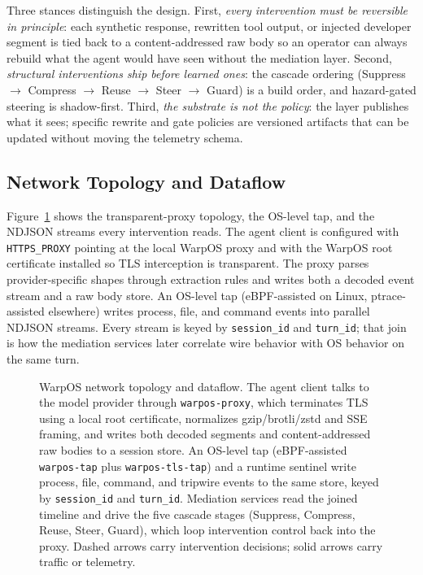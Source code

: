 \documentclass[conference]{IEEEtran}
\begin{document}
Three stances distinguish the design. First, \emph{every intervention must be reversible in principle}: each synthetic response, rewritten tool output, or injected developer segment is tied back to a content-addressed raw body so an operator can always rebuild what the agent would have seen without the mediation layer. Second, \emph{structural interventions ship before learned ones}: the cascade ordering (Suppress $\to$ Compress $\to$ Reuse $\to$ Steer $\to$ Guard) is a build order, and hazard-gated steering is shadow-first. Third, \emph{the substrate is not the policy}: the layer publishes what it sees; specific rewrite and gate policies are versioned artifacts that can be updated without moving the telemetry schema.

\subsection{Network Topology and Dataflow}
\label{app:warpos-net}

Figure~\ref{fig:warpos-arch} shows the transparent-proxy topology, the OS-level tap, and the NDJSON streams every intervention reads. The agent client is configured with \texttt{HTTPS\_PROXY} pointing at the local WarpOS proxy and with the WarpOS root certificate installed so TLS interception is transparent. The proxy parses provider-specific shapes through extraction rules and writes both a decoded event stream and a raw body store. An OS-level tap (eBPF-assisted on Linux, ptrace-assisted elsewhere) writes process, file, and command events into parallel NDJSON streams. Every stream is keyed by \texttt{session\_id} and \texttt{turn\_id}; that join is how the mediation services later correlate wire behavior with OS behavior on the same turn.

\begin{figure}[!t]
\centering

\caption{WarpOS network topology and dataflow. The agent client talks to the model provider through \texttt{warpos-proxy}, which terminates TLS using a local root certificate, normalizes gzip/brotli/zstd and SSE framing, and writes both decoded segments and content-addressed raw bodies to a session store. An OS-level tap (eBPF-assisted \texttt{warpos-tap} plus \texttt{warpos-tls-tap}) and a runtime sentinel write process, file, command, and tripwire events to the same store, keyed by \texttt{session\_id} and \texttt{turn\_id}. Mediation services read the joined timeline and drive the five cascade stages (Suppress, Compress, Reuse, Steer, Guard), which loop intervention control back into the proxy. Dashed arrows carry intervention decisions; solid arrows carry traffic or telemetry.}
\label{fig:warpos-arch}
\end{figure}
\end{document}

